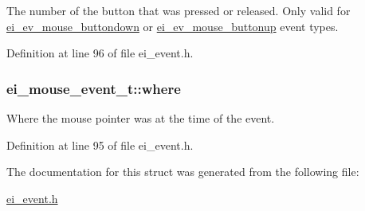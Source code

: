 The number of the button that was pressed or released. Only valid for \hyperlink{ei__event_8h_a132dde064150d861ad24e9d839cbe007ae75b2b6a8423d54c46a418d222e0af66}{ei\+\_\+ev\+\_\+mouse\+\_\+buttondown} or \hyperlink{ei__event_8h_a132dde064150d861ad24e9d839cbe007aabd9931e36fb3628cc044a2aafc2c7e4}{ei\+\_\+ev\+\_\+mouse\+\_\+buttonup} event types. 



Definition at line 96 of file ei\+\_\+event.\+h.

\hypertarget{structei__mouse__event__t_ac50f216f7af2a99469bd39cebc309af5}{
\subsubsection[{where}]{ ei\+\_\+mouse\+\_\+event\+\_\+t\+::where}}\label{structei__mouse__event__t_ac50f216f7af2a99469bd39cebc309af5}


Where the mouse pointer was at the time of the event. 



Definition at line 95 of file ei\+\_\+event.\+h.



The documentation for this struct was generated from the following file\+:\begin{DoxyCompactItemize}
\item 
\hyperlink{ei__event_8h}{ei\+\_\+event.\+h}\end{DoxyCompactItemize}
